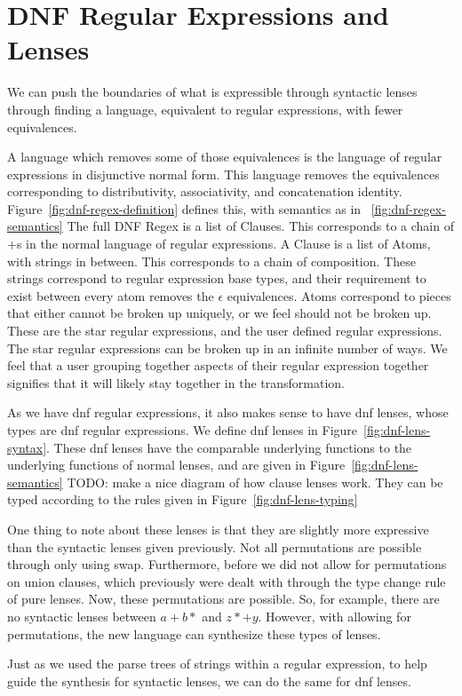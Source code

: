 \section{DNF Regular Expressions and Lenses}
We can push the boundaries of what is expressible through syntactic lenses
through finding a language, equivalent to regular expressions, with fewer
equivalences.



A language which removes some of those equivalences is the language of regular
expressions in disjunctive normal form.  This language removes the
equivalences corresponding to distributivity, associativity, and concatenation identity.
Figure~\ref{fig:dnf-regex-definition} defines this, with semantics as in
~\ref{fig:dnf-regex-semantics}
The full DNF Regex is a list of Clauses.  This corresponds to a chain of $+$s
in the normal language of regular expressions.
A Clause is a list of Atoms, with strings in between.
This corresponds to a chain of composition.  These strings
correspond to regular expression base types, and their requirement to
exist between every atom removes the $\epsilon$ equivalences.
Atoms correspond to pieces that either cannot be broken up uniquely, or we feel should not be broken up.
These are the star regular expressions, and the user defined regular expressions.
The star regular expressions can be broken up in an infinite number of ways.
We feel that a user grouping together aspects of their regular expression together
signifies that it will likely stay together in the transformation.




As we have dnf regular expressions, it also makes sense to have dnf lenses,
whose types are dnf regular expressions.  We define dnf lenses in Figure~\ref{fig:dnf-lens-syntax}.
These dnf lenses have the comparable underlying functions to the underlying functions
of normal lenses, and are given in Figure~\ref{fig:dnf-lens-semantics}
TODO: make a nice diagram of how clause lenses work.
They can be typed according to the rules given in Figure~\ref{fig:dnf-lens-typing}

One thing to note about these lenses is that they are slightly more expressive
than the syntactic lenses given previously.
Not all permutations are possible through only using swap.
Furthermore, before we did not allow for permutations on union clauses,
which previously were dealt with through the type change rule of pure lenses.
Now, these permutations are possible.  So, for example, there are no syntactic lenses
between $a+b*$ and $z*+y$.  However, with allowing for permutations, the new
language can synthesize these types of lenses.

Just as we used the parse trees of strings within a regular expression,
to help guide the synthesis for syntactic lenses, we can do the same
for dnf lenses.
